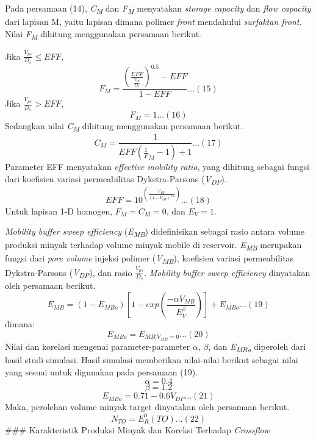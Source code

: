 \documentclass[
]{book}
\begin{document}
Pada persamaan (14), \emph{C\textsubscript{M}} dan \emph{F\textsubscript{M}} menyatakan \emph{storage capacity} dan \emph{flow capacity} dari lapisan M, yaitu lapisan dimana polimer \emph{front} mendahului \emph{surfaktan front}. Nilai \emph{F\textsubscript{M}} dihitung menggunakan persamaan berikut.

Jika \(\frac{V_{ps}}{D_s} \leq EFF,\)
\[F_M = \frac{\left( \frac{EFF}{\frac{V_{ps}}{D_s}}\right)^{0.5}-EFF}{1-EFF}...(15)\]
Jika \(\frac{V_{ps}}{D_s} > EFF,\)
\[F_M = 1...(16)\]
Sedangkan nilai \emph{C\textsubscript{M}} dihitung menggunakan persamaan berikut.
\[C_M = \frac{1}{EFF \left( \frac{1}F_M-1{}\right)+1}...(17)\]
Parameter EFF menyatakan \emph{effective mobility ratio}, yang dihitung sebagai fungsi dari koefisien variasi permeabilitas Dykstra-Parsons (\emph{V\textsubscript{DP}}).
\[EFF = 10^{ \left( \frac{V_{DP}}{(1-V_{DP})^{0.2}} \right)}...(18)\]
Untuk lapisan 1-D homogen, \(F_M = C_M = 0\), dan \(E_V = 1\).

\emph{Mobility buffer sweep efficiency} (\emph{E\textsubscript{MB}}) didefinisikan sebagai rasio antara volume produksi minyak terhadap volume minyak mobile di reservoir. \emph{E\textsubscript{MB}} merupakan fungsi dari \emph{pore volume} injeksi polimer (\emph{V\textsubscript{MB}}), koefisien variasi permeabilitas Dykstra-Parsons (\emph{V\textsubscript{DP}}), dan rasio \(\frac{V_{ps}}{D_s}\). \emph{Mobility buffer sweep efficiency} dinyatakan oleh persamaan berikut.
\[E_{MB}=(1-E_{MBo}) \left[ 1-exp \left( \frac{- \alpha V_{MB} }{E_V^{\beta}} \right) \right]+E_{MBo}...(19)\]
dimana:
\[E_{MBo} = E_{MB|V_{MB}=0}...(20)\]
Nilai dan korelasi mengenai parameter-parameter \(\alpha\), \(\beta\), dan \emph{E\textsubscript{MBo}} diperoleh dari hasil studi simulasi. Hasil simulasi memberikan nilai-nilai berikut sebagai nilai yang sesuai untuk digunakan pada persamaan (19).
\[\alpha = 0.4\]
\[\beta = 1.2\]
\[E_{MBo} = 0.71 - 0.6V_{DP}...(21)\]
Maka, perolehan volume minyak target dinyatakan oleh persamaan berikut.
\[N_{TO} = E_R^0(TO)...(22)\]
\#\#\# Karakteristik Produksi Minyak dan Koreksi Terhadap \emph{Crossflow}
\end{document}
